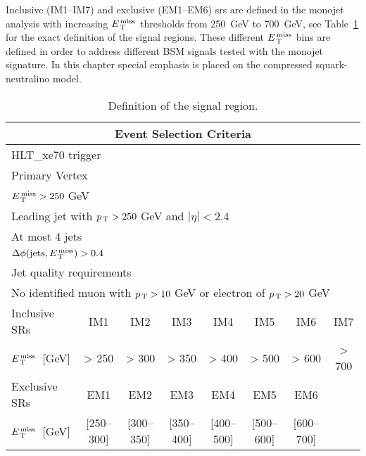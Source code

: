 Inclusive (IM1--IM7) and exclusive (EM1--EM6) \glspl{sr} are defined in the
monojet analysis with increasing $E_\mathrm{\, T}^\mathrm{\, miss}$ thresholds from 250~GeV to 700~GeV, see
Table~\ref{tab:event_selection} for the exact definition of the signal
regions. These different $E_\mathrm{\, T}^\mathrm{\, miss}$ bins are defined in order to address different
BSM signals tested with the monojet signature. In this chapter special emphasis
is placed on the compressed squark-neutralino model.
\begin{table}[!th]
  \centering
  \begin{tabular}{@{}l@{}c@{}c@{}c@{}c@{}c@{}c@{}c}
    \toprule
    \multicolumn{8}{c}{Event Selection Criteria} \\
    \midrule \midrule
    \multicolumn{8}{l}{HLT\_xe70 trigger} \\
    \multicolumn{8}{l}{Primary Vertex} \\
    \multicolumn{8}{l}{$E_\mathrm{\, T}^\mathrm{\, miss} > 250~$GeV} \\
    \multicolumn{8}{l}{Leading jet with $p_\mathrm{\, T} > 250~$GeV and $|\eta| < 2.4$} \\
    \multicolumn{8}{l}{At most 4 jets} \\
    \multicolumn{8}{l}{$\Delta \phi (\mathrm{jets}, E_\mathrm{\, T}^\mathrm{\, miss}) > 0.4$} \\
    \multicolumn{8}{l}{Jet quality requirements} \\
    \multicolumn{8}{l}{No identified muon with $p_\mathrm{\, T} > 10~$GeV or electron of
    $p_\mathrm{\, T} > 20~$GeV} \\
    \midrule
    Inclusive SRs & IM1 & IM2 & IM3 & IM4 & IM5 & IM6 & IM7 \\
    $E_\mathrm{\, T}^\mathrm{\, miss}$~[GeV] & > 250 & > 300 & > 350 & > 400 & > 500 & > 600 & > 700 \\
    \midrule
    Exclusive SRs & EM1 & EM2 & EM3 & EM4 & EM5 & EM6 \\
    $E_\mathrm{\, T}^\mathrm{\, miss}$~[GeV] & [250--300] & [300--350] & [350--400] & [400--500] &
    [500--600] & [600--700] \\
    \bottomrule
  \end{tabular}
  \caption{Definition of the signal region.}
  \label{tab:event_selection}
\end{table}
